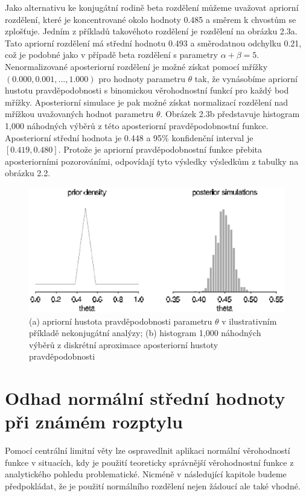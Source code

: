 Jako alternativu ke konjugátní rodině beta rozdělení můžeme uvažovat apriorní rozdělení, které je koncentrované okolo hodnoty 0.485 a směrem k chvostům se zplošťuje. Jedním z příkladů takovéhoto rozdělení je rozdělení na obrázku 2.3a. Tato apriorní rozdělení má střední hodnotu 0.493 a směrodatnou odchylku 0.21, což je podobné jako v případě beta rozdělení s parametry $\alpha + \beta = 5$. Nenormalizované aposteriorní rozdělení je možné získat pomocí mřížky $(0.000, 0.001, ..., 1.000)$ pro hodnoty parametru $\theta$ tak, že vynásobíme apriorní hustotu pravděpodobnosti s binomickou věrohodnostní funkcí pro každý bod mřížky. Aposteriorní simulace je pak možné získat normalizací rozdělení nad mřížkou uvažovaných hodnot parametru $\theta$. Obrázek 2.3b představuje histogram 1,000 náhodných výběrů z této aposteriorní pravděpodobnostní funkce. Aposteriorní střední hodnota je 0.448 a 95\% konfidenční interval je $[0.419, 0.480]$. Protože je apriorní pravděpodobnostní funkce přebita aposteriorními pozorováními, odpovídají tyto výsledky výsledkům z tabulky na obrázku 2.2.

\begin{figure}[htp]
\centering
\includegraphics[scale = 0.50]{pictures/fig_2_4.eps}
\caption{(a) apriorní hustota pravděpodobnosti parametru $\theta$ v ilustrativním příkladě nekonjugátní analýzy; (b) histogram 1,000 náhodných výběrů z diskrétní aproximace aposteriorní hustoty pravděpodobnosti}
\label{fig_2_4}
\end{figure}

\section{Odhad normální střední hodnoty při známém rozptylu}

Pomocí centrální limitní věty lze ospravedlnit aplikaci normální věrohodností funkce v situacích, kdy je použití teoreticky správnější věrohodnostní funkce z analytického pohledu problematické. Nicméně v následující kapitole budeme předpokládat, že je použití normálního rozdělení nejen žádoucí ale také vhodné.

